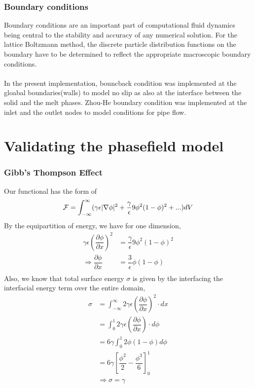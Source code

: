\documentclass[12pt,a4paper]{report}
\begin{document}
	\subsection{Boundary conditions}
	
	Boundary conditions are an important part of computational 
	fluid dynamics being central to the stability and accuracy 
	of any numerical solution. For the lattice Boltzmann method, 
	the discrete particle distribution functions on the boundary 
	have to be determined to reflect the appropriate macroscopic 
	boundary conditions.\\
	\\
	In the present implementation, bouncback condition was implemented
	at the gloabal boundaries(walls) to model no slip as also at the
	interface between the solid and the melt phases. Zhou-He boundary
	condition was implemented at the inlet and the outlet nodes to 
	model conditions for pipe flow.
\chapter{Validating the phasefield model}
\subsection{Gibb's Thompson Effect}
	
	Our functional has the form of
	\begin{align*}
		{\cal F} = \int_{-\infty}^{\infty}(\gamma \epsilon|\nabla\phi|^2 + \dfrac{\gamma}{\epsilon}9\phi^2(1-\phi)^2 + ...)dV
	\end{align*}
	By the equipartition of energy, we have for one dimension,\\
	\begin{align*}
	\gamma\epsilon\left(\dfrac{\partial\phi}{\partial x}\right)^2 &= \dfrac{\gamma}{\epsilon}9\phi^2(1-\phi)^2\\
	\Rightarrow \dfrac{\partial\phi}{\partial x} &= \dfrac{3}{\epsilon}\phi(1-\phi)\\
	\end{align*}
	Also, we know that total surface energy $\sigma$ is given by the interfacing the interfacial 
	energy term over the entire domain,
	\begin{align*}
	\sigma &= \int_{-\infty}^{\infty}2\gamma\epsilon\left(\dfrac{\partial\phi}{\partial x}\right)^2\cdot dx\\
	&= \int_{0}^{1}2\gamma\epsilon\left(\dfrac{\partial\phi}{\partial x}\right)\cdot d\phi\\
	&= 6\gamma\int_{0}^{1}2\phi(1-\phi) d\phi\\
	&= 6\gamma \left[\dfrac{\phi^2}{2} - \dfrac{\phi^3}{6}\right]_{0}^{1}\\
	&\Rightarrow \sigma = \gamma
	\end{align*}
	
\end{document}
